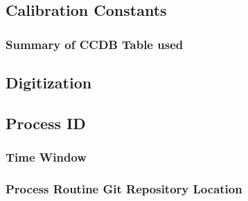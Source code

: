 \subsection{Calibration Constants}

\subsubsection{Summary of CCDB Table used}

\subsection{Digitization}

\subsection{Process ID}

\subsubsection{Time Window}

\subsubsection{Process Routine Git Repository Location}


